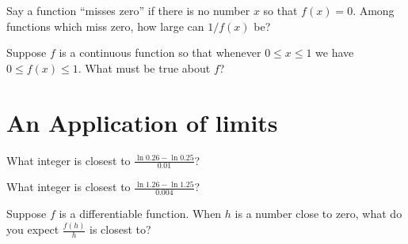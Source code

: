 \documentclass{ximera}
\begin{document}
\begin{problem}
  Say a function ``misses zero'' if there is no number $x$ so that
  $f(x) = 0$.  Among functions which miss zero, how large can $1/f(x)$
  be?
  \begin{multipleChoice}
  \end{multipleChoice}
\end{problem}

\begin{problem}
  Suppose $f$ is a continuous function so that whenever $0 \leq x \leq 1$ we have $0 \leq f(x) \leq 1$.  What must be true about $f$?
  \begin{multipleChoice}
  \end{multipleChoice}
\end{problem}

\clearpage

\section{An Application of limits}

\begin{problem}
  What integer is closest to $\frac{\ln 0.26 - \ln 0.25}{0.01}$?
  \begin{multipleChoice}
  \end{multipleChoice}
\end{problem}

\begin{problem}
  What integer is closest to $\frac{\ln 1.26 - \ln 1.25}{0.004}$?
  \begin{multipleChoice}
  \end{multipleChoice}
\end{problem}

\begin{problem}
  Suppose $f$ is a differentiable function.  When $h$ is a number
  close to zero, what do you expect $\frac{f(h)}{h}$ is closest to?
  \begin{multipleChoice}
  \end{multipleChoice}
\end{problem}
\end{document}
